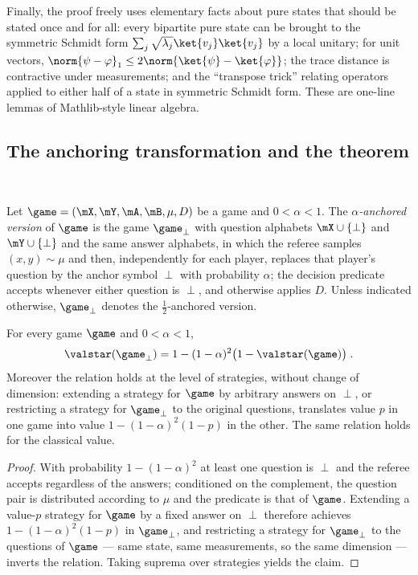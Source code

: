 \medskip

Finally, the proof freely uses elementary facts about pure states that should be
stated once and for all: every bipartite pure state can be brought to the symmetric
Schmidt form $\sum_j \sqrt{\lambda_j} \ket{v_j}\ket{v_j}$ by a local unitary; for unit
vectors, $\norm{\psi - \varphi}_1 \leq 2 \norm{ \ket{\psi} - \ket{\varphi} }$; the
trace distance is contractive under measurements; and the ``transpose trick''
relating operators applied to either half of a state in symmetric Schmidt form. These
are one-line lemmas of Mathlib-style linear algebra.

\subsection{The anchoring transformation and the theorem}
\label{sec:ar-anchoring}

\effortEasy\ \qlib

\begin{definition}[Anchoring]
\label{def:anchoring}
\qlib{}
Let $\game = (\mX, \mY, \mA, \mB, \mu, D)$ be a game and $0 < \alpha < 1$. The
\emph{$\alpha$-anchored version} of $\game$ is the game $\game_\perp$ with question
alphabets $\mX \cup \{\perp\}$ and $\mY \cup \{\perp\}$ and the same answer alphabets,
in which the referee samples $(x, y) \sim \mu$ and then, independently for each
player, replaces that player's question by the anchor symbol $\perp$ with probability
$\alpha$; the decision predicate accepts whenever either question is $\perp$, and
otherwise applies $D$. Unless indicated otherwise, $\game_\perp$ denotes the
$\frac12$-anchored version.
\end{definition}

\begin{lemma}
\label{lem:anchoring-value}
\qlib{}
For every game $\game$ and $0 < \alpha < 1$,
\begin{equation*}
  \valstar(\game_\perp) = 1 - (1 - \alpha)^2 \bigl( 1 - \valstar(\game) \bigr)\;.
\end{equation*}
Moreover the relation holds at the level of strategies, without change of dimension:
extending a strategy for $\game$ by arbitrary answers on $\perp$, or restricting a
strategy for $\game_\perp$ to the original questions, translates value $p$ in one game
into value $1 - (1-\alpha)^2 (1 - p)$ in the other. The same relation holds for the
classical value.
\end{lemma}
\begin{proof}
With probability $1 - (1 - \alpha)^2$ at least one question is $\perp$ and the referee
accepts regardless of the answers; conditioned on the complement, the question pair is
distributed according to $\mu$ and the predicate is that of $\game$. Extending a
value-$p$ strategy for $\game$ by a fixed answer on $\perp$ therefore achieves $1 - (1
- \alpha)^2 (1 - p)$ in $\game_\perp$, and restricting a strategy for $\game_\perp$ to
the questions of $\game$ --- same state, same measurements, so the same dimension ---
inverts the relation. Taking suprema over strategies yields the claim.
\end{proof}

